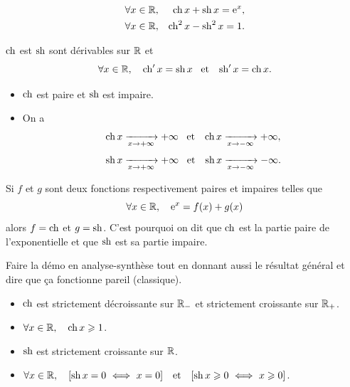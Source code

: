 \documentclass{magnoliaold}
\begin{document}
\begin{proposition}[utile=-3]
\begin{eqnarray*}
\forall x\in\mathbb{R}, & & \operatorname{ch} x+\operatorname{sh} x={\rm e}^x,\\
\forall x\in\mathbb{R}, & & \operatorname{ch}^2 x-\operatorname{sh}^2 x=1.  
\end{eqnarray*}
\end{proposition}


\begin{proposition}[utile=-3]
$\operatorname{ch}$ est $\operatorname{sh}$ sont dérivables sur $\mathbb{R}$ et
\[\forall x\in\mathbb{R} ,\quad \operatorname{ch}'x=\operatorname{sh} x \quad\!\text{et}\quad\! \operatorname{sh}'x=\operatorname{ch} x.\]
\end{proposition}

\begin{proposition}[utile=-3]
\begin{itemize}
\item $\operatorname{ch}$ est paire et $\operatorname{sh}$ est impaire.
\item On a
  \[\operatorname{ch} x \xrightarrow[x\rightarrow +\infty]{} +\infty \quad\!\text{et}\quad\!
    \operatorname{ch} x \xrightarrow[x\rightarrow -\infty]{} +\infty,\]
  \[\operatorname{sh} x \xrightarrow[x\rightarrow +\infty]{} +\infty \quad\!\text{et}\quad\!
    \operatorname{sh} x \xrightarrow[x\rightarrow -\infty]{} -\infty.\]
\end{itemize}
\end{proposition}

\begin{remarqueUnique}
\remarque Si $f$ et $g$ sont deux fonctions respectivement paires et impaires
  telles que
  \[\forall x\in\mathbb{R} ,\quad {\rm e}^x=f(x)+g(x)\]
  alors $f=\operatorname{ch}$ et $g=\operatorname{sh}$. C'est pourquoi on dit que $\operatorname{ch}$ est la
  partie paire de l'exponentielle et que $\operatorname{sh}$ est sa partie impaire.
\end{remarqueUnique}
\begin{sol}
Faire la démo en analyse-synthèse tout en donnant aussi le résultat général et dire que ça fonctionne pareil (classique).
\end{sol}

\begin{proposition}[utile=-3]
\begin{itemize}
\item $\operatorname{ch}$ est strictement décroissante sur $\mathbb{R}_-$ et strictement croissante sur
  $\mathbb{R}_+$.
\item $\forall x\in\mathbb{R} ,\quad \operatorname{ch} x\geqslant 1$.
\item $\operatorname{sh}$ est strictement croissante sur $\mathbb{R}$.
\item $\forall x\in\R \qsep \cro{\sh x=0 \ \ssi\  x=0} \et
  \cro{\sh x\geq 0 \ \ssi\  x\geq 0}$.
\end{itemize}
\end{proposition}
\end{document}
